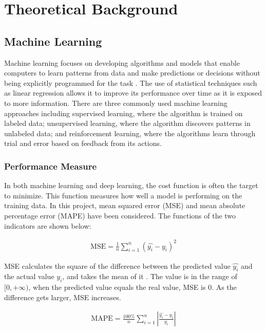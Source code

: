 \chapter{Theoretical Background} \label{Chapter:Background}

\section{Machine Learning}

Machine learning focuses on developing algorithms and models that enable computers to learn patterns from data and make predictions or decisions without being explicitly programmed for the task \cite{Murphy}. 
The use of statistical techniques such as linear regression allows it to improve its performance over time as it is exposed to more information. 
There are three commonly used machine learning approaches \cite{Bishop} including supervised learning, where the algorithm is trained on labeled data; 
unsupervised learning, where the algorithm discovers patterns in unlabeled data; and reinforcement learning, where the algorithms learn through trial and error based on feedback from its actions.

\subsection{Performance Measure}

In both machine learning and deep learning, the cost function is often the target to minimize. This function measures how well a model is performing on the training data.
In this project, mean squared error (MSE) and mean absolute percentage error (MAPE) have been considered. The functions of the two indicators are shown below:

\begin{gather}
    \mathrm{MSE} = \frac{1}{n}\sum_{i=1}^{n}(\hat{y_i} -y_i)^2 
\end{gather}

MSE calculates the square of the difference between the predicted value $\hat{y_i}$ and the actual value $y_i$, and takes the mean of it \cite{Bishop}. 
The value is in the range of $[0, +\infty)$, when the predicted value equals the real value, MSE is 0. As the difference gets larger, MSE increases. 

\begin{gather}
    \mathrm{MAPE} = \frac{100\%}{n} \sum_{i=1}^{n} \left | \frac{\hat{y_i}-y_i}{y_i} \right | 
\end{gather}

